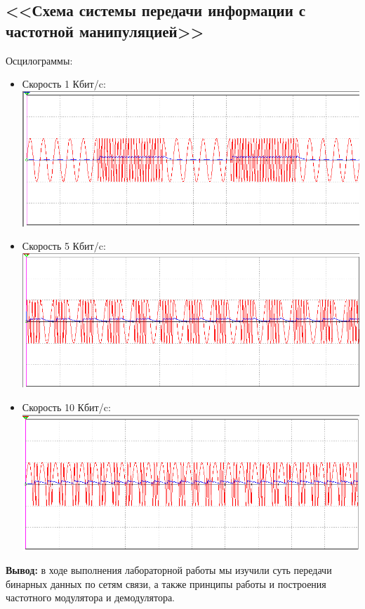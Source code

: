 \documentclass[11pt]{article}
\begin{document}
\subsection{<<Схема системы передачи информации с частотной манипуляцией>>}
Осцилограммы:\\
\begin{itemize}
\item Скорость 1 Кбит/c:\\
\includegraphics[width=1\linewidth]{img/3/pic3_1.png}
\item Скорость 5 Кбит/c:\\
\includegraphics[width=1\linewidth]{img/3/pic3_2.png}
\item Скорость 10 Кбит/c:\\
\includegraphics[width=1\linewidth]{img/3/pic3_3.png}
\end{itemize}
\textbf{Вывод:} в ходе выполнения лабораторной работы мы изучили суть передачи бинарных данных по сетям связи, а также принципы работы и построения частотного модулятора и демодулятора.
\end{document}
